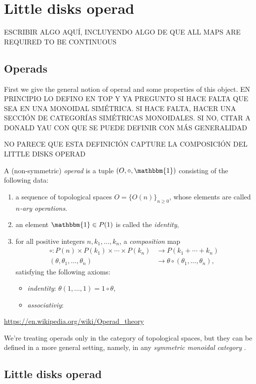 \documentclass[TFM.tex]{subfiles}
\begin{document}
\chapter{Little disks operad}

ESCRIBIR ALGO AQUÍ, INCLUYENDO ALGO DE QUE ALL MAPS ARE REQUIRED TO BE CONTINUOUS


\section{Operads}
First we give the general notion of operad and some properties of this object. EN PRINCIPIO LO DEFINO EN TOP Y YA PREGUNTO SI HACE FALTA QUE SEA EN UNA MONOIDAL SIMÉTRICA. SI HACE FALTA, HACER UNA SECCIÓN DE CATEGORÍAS SIMÉTRICAS MONOIDALES. SI NO, CITAR A DONALD YAU CON QUE SE PUEDE DEFINIR CON MÁS GENERALIDAD


NO PARECE QUE ESTA DEFINICIÓN CAPTURE LA COMPOSICIÓN DEL LITTLE DISKS OPERAD
\begin{defi}
A (non-symmetric) \emph{operad} is a tuple $(O, \circ, \mathbbm{1})$ consisting of the following data:
\begin{enumerate}[(1)]
\item a sequence of topological spaces $O=\{O(n)\}_{n\geq 0}$, whose elements are called \emph{$n$-ary operations}.
\item an element $\mathbbm{1}\in P(1)$ is called the \emph{identity},
\item for all positive integers $n,k_1,\dots, k_n$, a \emph{composition} map
\begin{align*}
\circ:P(n)\times P(k_1)\times\cdots\times P(k_n)&\to P(k_1+\cdots+k_n)\\
(\theta, \theta_1,\dots, \theta_n)&\to \theta\circ(\theta_1,\dots, \theta_n),
\end{align*}
satisfying the following axioms:
\begin{itemize}
\item \emph{indentity}: $\theta(1,\dots, 1)=1\circ\theta$,
\item \emph{associativiy}:
\end{itemize}
\end{enumerate}
\end{defi}

\url{https://en.wikipedia.org/wiki/Operad_theory}

We're treating operads only in the category of topological spaces, but they can be defined in a more general setting, namely, in any \emph{symmetric monoidal category} \cite{Yau}.

\section{Little disks operad}
\end{document}
